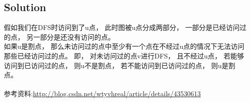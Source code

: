\documentclass{article}
\begin{document}
\subsection*{Solution}
\begin{CJK}{UTF8}{song}
    假如我们在DFS时访问到了u点，
    此时图被u点分成两部分，
    一部分是已经访问过的点，
    另一部分是还没有访问的点。\\
    如果u是割点，
    那么未访问过的点中至少有一个点在不经过u点的情况下无法访问那些已经访问过的点。
    即，
    对未访问过的点v进行DFS，
    且不经过u点，
    若能够访问到已访问过的点，
    则u不是割点，
    若不能访问到已访问过的点，
    则u是割点。\\\\
    参考资料:\url{http://blog.csdn.net/wtyvhreal/article/details/43530613}
\end{CJK}
\end{document}
